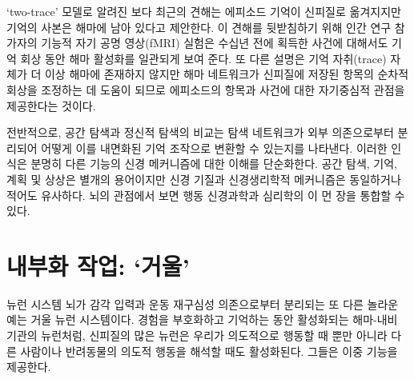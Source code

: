 \documentclass[openany]{book}
\begin{document}
\begin{appendices}
`two-trace’ 모델로 알려진 보다 최근의 견해는 에피소드 기억이 신피질로 옮겨지지만 기억의 사본은 해마에 남아 있다고 제안한다. 이 견해를 뒷받침하기 위해 인간 연구 참가자의 기능적 자기 공명 영상(fMRI) 실험은 수십년 전에 획득한 사건에 대해서도 기억 회상 동안 해마 활성화를 일관되게 보여 준다. 또 다른 설명은 기억 자취(trace) 자체가 더 이상 해마에 존재하지 않지만 해마 네트워크가 신피질에 저장된 항목의 순차적 회상을 조정하는 데 도움이 되므로 에피소드의 항목과 사건에 대한 자기중심적 관점을 제공한다는 것이다.

전반적으로, 공간 탐색과 정신적 탐색의 비교는 탐색 네트워크가 외부 의존으로부터 분리되어 어떻게 이를 내면화된 기억 조작으로 변환할 수 있는지를 나타낸다. 이러한 인식은 분명히 다른 기능의 신경 메커니즘에 대한 이해를 단순화한다.  공간 탐색, 기억, 계획 및 상상은 별개의 용어이지만 신경 기질과 신경생리학적 메커니즘은 동일하거나 적어도 유사하다. 뇌의 관점에서 보면 행동 신경과학과 심리학의 이 먼 장을 통합할 수 있다.

\section{내부화 작업: `거울’}
뉴런 시스템 뇌가 감각 입력과 운동 재구심성 의존으로부터 분리되는 또 다른 놀라운 예는 거울 뉴런 시스템이다. 경험을 부호화하고 기억하는 동안 활성화되는 해마-내비 기관의 뉴런처럼, 신피질의 많은 뉴런은 우리가 의도적으로 행동할 때 뿐만 아니라 다른 사람이나 반려동물의 의도적 행동을 해석할 때도 활성화된다. 그들은 이중 기능을 제공한다.


\end{appendices}
\end{document}
